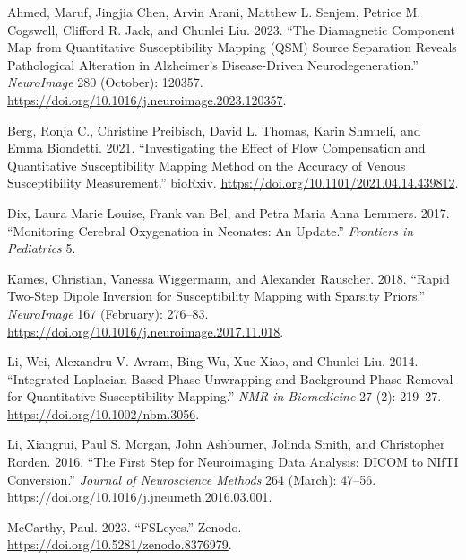 \documentclass[
sn-nature
]{sn-jnl}
\newlength{\cslhangindent}
\newenvironment{CSLReferences}[2] %
 {\begin{list}{}{%
  \setlength{\itemindent}{0pt}
  \setlength{\leftmargin}{0pt}
  \setlength{\parsep}{0pt}
  \ifodd #1
   \setlength{\leftmargin}{\cslhangindent}
   \setlength{\itemindent}{-1\cslhangindent}
  \fi
  \setlength{\itemsep}{#2\baselineskip}}}
 {\end{list}}
\begin{document}
\label{refs}
\begin{CSLReferences}{1}{0}
Ahmed, Maruf, Jingjia Chen, Arvin Arani, Matthew L. Senjem, Petrice M.
Cogswell, Clifford R. Jack, and Chunlei Liu. 2023. {``The Diamagnetic
Component Map from Quantitative Susceptibility Mapping ({QSM}) Source
Separation Reveals Pathological Alteration in {Alzheimer}'s
Disease-Driven Neurodegeneration.''} \emph{NeuroImage} 280 (October):
120357. \url{https://doi.org/10.1016/j.neuroimage.2023.120357}.

Berg, Ronja C., Christine Preibisch, David L. Thomas, Karin Shmueli, and
Emma Biondetti. 2021. {``Investigating the {Effect} of {Flow
Compensation} and {Quantitative Susceptibility Mapping Method} on the
{Accuracy} of {Venous Susceptibility Measurement}.''} bioRxiv.
\url{https://doi.org/10.1101/2021.04.14.439812}.

Dix, Laura Marie Louise, Frank van Bel, and Petra Maria Anna Lemmers.
2017. {``Monitoring {Cerebral Oxygenation} in {Neonates}: {An
Update}.''} \emph{Frontiers in Pediatrics} 5.

Kames, Christian, Vanessa Wiggermann, and Alexander Rauscher. 2018.
{``Rapid Two-Step Dipole Inversion for Susceptibility Mapping with
Sparsity Priors.''} \emph{NeuroImage} 167 (February): 276--83.
\url{https://doi.org/10.1016/j.neuroimage.2017.11.018}.

Li, Wei, Alexandru V. Avram, Bing Wu, Xue Xiao, and Chunlei Liu. 2014.
{``Integrated {Laplacian}-Based Phase Unwrapping and Background Phase
Removal for Quantitative Susceptibility Mapping.''} \emph{NMR in
Biomedicine} 27 (2): 219--27. \url{https://doi.org/10.1002/nbm.3056}.

Li, Xiangrui, Paul S. Morgan, John Ashburner, Jolinda Smith, and
Christopher Rorden. 2016. {``The First Step for Neuroimaging Data
Analysis: {DICOM} to {NIfTI} Conversion.''} \emph{Journal of
Neuroscience Methods} 264 (March): 47--56.
\url{https://doi.org/10.1016/j.jneumeth.2016.03.001}.

McCarthy, Paul. 2023. {``{FSLeyes}.''} Zenodo.
\url{https://doi.org/10.5281/zenodo.8376979}.


\end{CSLReferences}
\end{document}
